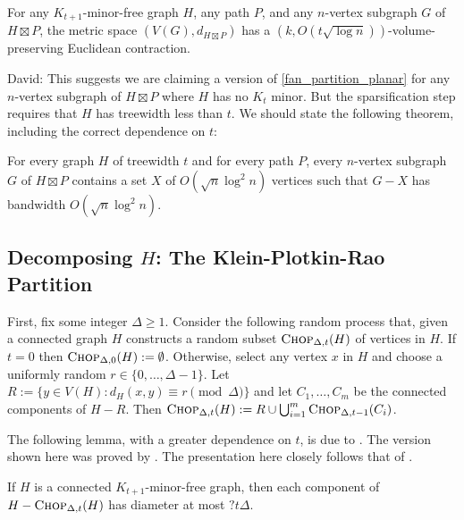 \documentclass{patmorin}
\newcommand{\david}[1]{{\color{orange} David: #1}}
\begin{document}
\begin{thm}\label{product_contraction}
  For any $K_{t+1}$-minor-free graph $H$, any path $P$, and any $n$-vertex subgraph $G$ of $H\boxtimes P$, the metric space $(V(G),d_{H\boxtimes P})$ has a $(k,O(t\sqrt{\log n}))$-volume-preserving Euclidean contraction.
\end{thm}

\david{This suggests we are claiming a version of \cref{fan_partition_planar} for any $n$-vertex subgraph of $H\boxtimes P$ where $H$ has no $K_t$ minor. But the sparsification step requires that $H$ has treewidth less than $t$. We should state the following theorem, including the correct dependence on $t$:
\begin{thm}\label{fan_partition_HP}
For every graph $H$ of treewidth $t$ and for every path $P$, every $n$-vertex  subgraph $G$ of $H\boxtimes P$ contains a set $X$ of $O(\sqrt{n}\log^2 n)$ vertices such that $G-X$ has bandwidth $O(\sqrt{n}\log^2 n)$. 
\end{thm}
}





\subsection{Decomposing $H$: The Klein-Plotkin-Rao Partition}

First, fix some integer $\Delta \ge 1$.
Consider the following random process that, given a connected graph $H$ constructs a random subset $\textsc{Chop}_{\Delta,t}(H)$ of vertices in $H$. If $t=0$ then $\textsc{Chop}_{\Delta,0}(H):=\emptyset$.  Otherwise, select any vertex $x$ in $H$ and choose a uniformly random $r\in\{0,\ldots,\Delta-1\}$.  Let $R:=\{y\in V(H):d_{H}(x,y)\equiv r\pmod{\Delta}\}$ and let $C_1,\ldots,C_m$ be the connected components of $H-R$.  Then $\textsc{Chop}_{\Delta,t}(H):=R\cup\bigcup_{i=1}^m \textsc{Chop}_{\Delta,t-1}(C_i)$.


The following lemma, with a greater dependence on $t$, is due to \citet{klein.plotkin.ea:excluded}. The version shown here was proved by \citet{fakcharoenphol.talwar:improved}. The presentation here closely follows that of \citet{lee:simpler}.

\begin{lem}\label{component_diameter_h}
  If $H$ is a connected $K_{t+1}$-minor-free graph, then each component of $H-\textsc{Chop}_{\Delta,t}(H)$ has diameter at most $?t\Delta$.
\end{lem}
\end{document}

